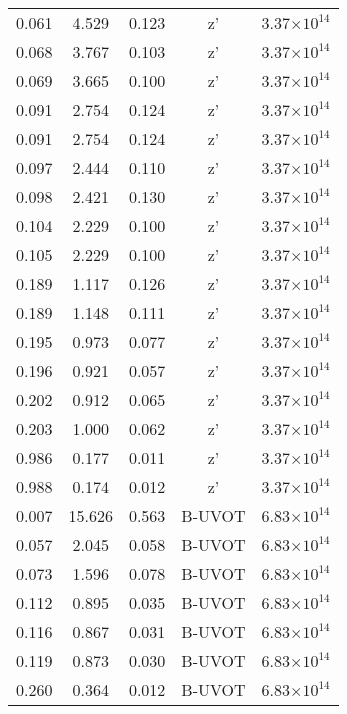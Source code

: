 \documentclass{aa}
\begin{document}
{\begin{longtable}{c|c|c|c|c}
  0.061 &   4.529 &  0.123 & z'        &  3.37$\times 10^{14}$    \\
  0.068 &   3.767 &  0.103 & z'        &  3.37$\times 10^{14}$    \\
  0.069 &   3.665 &  0.100 & z'        &  3.37$\times 10^{14}$    \\
  0.091 &   2.754 &  0.124 & z'        &  3.37$\times 10^{14}$    \\
  0.091 &   2.754 &  0.124 & z'        &  3.37$\times 10^{14}$    \\
  0.097 &   2.444 &  0.110 & z'        &  3.37$\times 10^{14}$    \\
  0.098 &   2.421 &  0.130 & z'        &  3.37$\times 10^{14}$    \\
  0.104 &   2.229 &  0.100 & z'        &  3.37$\times 10^{14}$    \\
  0.105 &   2.229 &  0.100 & z'        &  3.37$\times 10^{14}$    \\
  0.189 &   1.117 &  0.126 & z'        &  3.37$\times 10^{14}$    \\
  0.189 &   1.148 &  0.111 & z'        &  3.37$\times 10^{14}$    \\
  0.195 &   0.973 &  0.077 & z'        &  3.37$\times 10^{14}$    \\
  0.196 &   0.921 &  0.057 & z'        &  3.37$\times 10^{14}$    \\
  0.202 &   0.912 &  0.065 & z'        &  3.37$\times 10^{14}$    \\
  0.203 &   1.000 &  0.062 & z'        &  3.37$\times 10^{14}$    \\
  0.986 &   0.177 &  0.011 & z'        &  3.37$\times 10^{14}$    \\
  0.988 &   0.174 &  0.012 & z'        &  3.37$\times 10^{14}$    \\
  0.007 &  15.626 &  0.563 & B-UVOT    &  6.83$\times 10^{14}$    \\
  0.057 &   2.045 &  0.058 & B-UVOT    &  6.83$\times 10^{14}$    \\
  0.073 &   1.596 &  0.078 & B-UVOT    &  6.83$\times 10^{14}$    \\
  0.112 &   0.895 &  0.035 & B-UVOT    &  6.83$\times 10^{14}$    \\
  0.116 &   0.867 &  0.031 & B-UVOT    &  6.83$\times 10^{14}$    \\
  0.119 &   0.873 &  0.030 & B-UVOT    &  6.83$\times 10^{14}$    \\
  0.260 &   0.364 &  0.012 & B-UVOT    &  6.83$\times 10^{14}$    \\

\end{longtable}}
\end{document}
